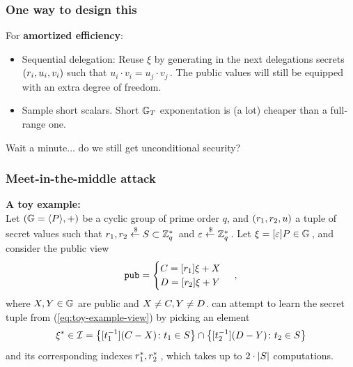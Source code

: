 \documentclass{beamer}
\begin{document}
\begin{frame}
    \frametitle{One way to design this}
    For \textbf{amortized efficiency}:
    \vspace{1em}
    \pause
    \begin{itemize}
        \setlength{\itemsep}{7.5pt}
        \item Sequential delegation: Reuse $\xi$ by generating in the next delegations secrets $(r_i,u_i,v_i)$ such that $u_i\cdot v_i=u_j\cdot v_j\,$. The public values will still be equipped with an extra degree of freedom.  
        \pause
        \item Sample short scalars. Short $\mathbb{G}_T$ exponentation is (a lot) cheaper than a full-range one.
    \end{itemize}
    \vspace{1em}
    \pause
    Wait a minute... do we still get unconditional security?
\end{frame}

\begin{frame}
    \frametitle{Meet-in-the-middle attack}
\small
\textbf{A toy example:}
\\
\vspace{1em}
Let $(\mathbb{G}=\langle P\rangle,+)$ be a cyclic group of prime order $q$, 
and $(r_1,r_2,u)$ a tuple of secret values such that 
$r_1,r_2\overset{\,\$}{\gets} S\subset
\mathbb {Z}_q^*\,$ and $\varepsilon\overset{\,\$}{\gets}\mathbb {Z}_q^*\,$. Let $\xi=[\varepsilon]P\in\mathbb{G}\,$, and consider the public view 
	\begin{equation}
		{\tt pub}=\begin{cases}
			C=[r_1]\xi+X
			\\
			D=[r_2]\xi+Y
		\end{cases}\label{eq:toy-example-view}
		\,,
	\end{equation}
	where $X,Y\in\mathbb{G}$ are public and  $X\neq C,Y\neq D$.  
    \adversary can attempt to learn the secret tuple from (\ref{eq:toy-example-view}) by picking an element 
	\begin{equation}
		{\xi}^*\in\mathcal{I}=\left\{[t_1^{-1}](C-X)\colon t_1\in S\right\}\cap
		\left\{[t_2^{-1}](D-Y)\colon t_2\in S\right\}
		\label{eq:intersection}		
	\end{equation}
	and its corresponding indexes ${r}^*_1,{r}^*_2\,$, 	
	which takes up to $2\cdot\left\lvert S \right\rvert$ computations.
\end{frame}
\end{document}
